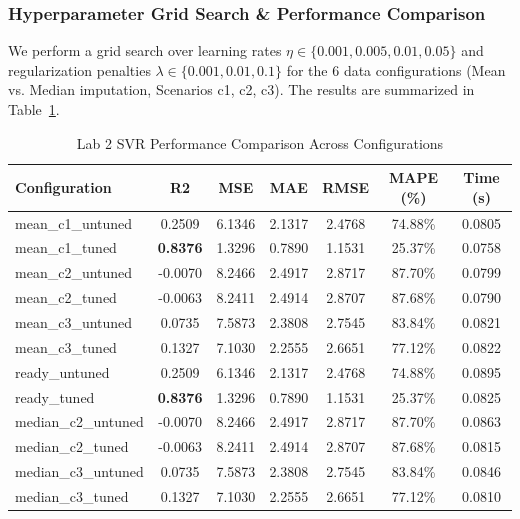 \documentclass[12pt,a4paper]{article}
\begin{document}
\subsubsection{Hyperparameter Grid Search \& Performance Comparison}
We perform a grid search over learning rates $\eta \in \{0.001, 0.005, 0.01, 0.05\}$ and regularization penalties $\lambda \in \{0.001, 0.01, 0.1\}$ for the 6 data configurations (Mean vs. Median imputation, Scenarios c1, c2, c3). The results are summarized in Table~\ref{tab:svr_comparison}.
\begin{table}[H]
\centering
\caption{Lab 2 SVR Performance Comparison Across Configurations}
\label{tab:svr_comparison}
\begin{tabular}{lcccccc}
\toprule
\textbf{Configuration} & \textbf{R2} & \textbf{MSE} & \textbf{MAE} & \textbf{RMSE} & \textbf{MAPE (\%)} & \textbf{Time (s)} \\
\midrule
mean\_c1\_untuned & 0.2509 & 6.1346 & 2.1317 & 2.4768 & 74.88\% & 0.0805 \\
mean\_c1\_tuned & \textbf{0.8376} & 1.3296 & 0.7890 & 1.1531 & 25.37\% & 0.0758 \\
mean\_c2\_untuned & -0.0070 & 8.2466 & 2.4917 & 2.8717 & 87.70\% & 0.0799 \\
mean\_c2\_tuned & -0.0063 & 8.2411 & 2.4914 & 2.8707 & 87.68\% & 0.0790 \\
mean\_c3\_untuned & 0.0735 & 7.5873 & 2.3808 & 2.7545 & 83.84\% & 0.0821 \\
mean\_c3\_tuned & 0.1327 & 7.1030 & 2.2555 & 2.6651 & 77.12\% & 0.0822 \\
\midrule
ready\_untuned & 0.2509 & 6.1346 & 2.1317 & 2.4768 & 74.88\% & 0.0895 \\
ready\_tuned & \textbf{0.8376} & 1.3296 & 0.7890 & 1.1531 & 25.37\% & 0.0825 \\
median\_c2\_untuned & -0.0070 & 8.2466 & 2.4917 & 2.8717 & 87.70\% & 0.0863 \\
median\_c2\_tuned & -0.0063 & 8.2411 & 2.4914 & 2.8707 & 87.68\% & 0.0815 \\
median\_c3\_untuned & 0.0735 & 7.5873 & 2.3808 & 2.7545 & 83.84\% & 0.0846 \\
median\_c3\_tuned & 0.1327 & 7.1030 & 2.2555 & 2.6651 & 77.12\% & 0.0810 \\
\bottomrule
\end{tabular}
\end{table}
\end{document}
